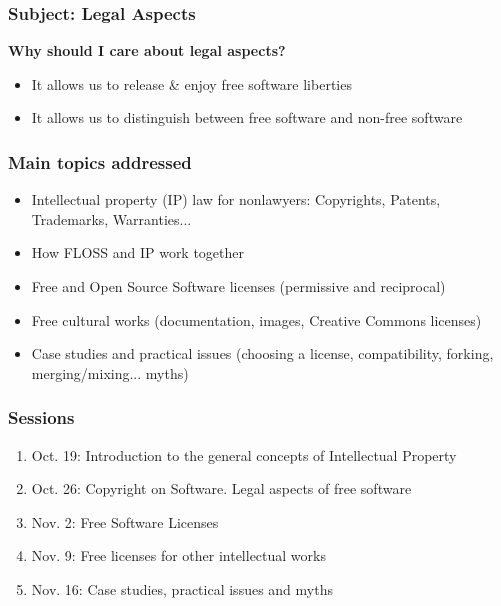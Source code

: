 \documentclass{beamer}
\begin{document}

\begin{frame}
\frametitle{Subject: Legal Aspects}


\center \Large \textbf{Why should I care about legal aspects?}
 
\pause

\bigskip
\normalsize
\begin{itemize}
\item \alert{It allows us to release \& enjoy free software liberties}
\pause
\item \alert{It allows us to distinguish between free software and non-free software}
\end{itemize}

\end{frame}


\begin{frame}
\frametitle{Main topics addressed}

\begin{itemize}
   \item Intellectual property (IP) law \alert{for nonlawyers}: Copyrights,
Patents, Trademarks, Warranties...
   \item How FLOSS and IP work together
   \item Free and Open Source Software licenses (permissive and reciprocal)
   \item Free cultural works (documentation, images, Creative Commons
licenses)
   \item Case studies and practical issues (choosing a license, compatibility,
forking, merging/mixing... myths)
\end{itemize}

\end{frame}


\begin{frame}
\frametitle{Sessions}

\begin{enumerate}
\item \alert{Oct. 19:} Introduction to the general concepts of Intellectual Property
\item \alert{Oct. 26:} Copyright on Software. Legal aspects of free software
\item \alert{Nov. 2:} Free Software Licenses
\item \alert{Nov. 9:} Free licenses for other intellectual works
\item \alert{Nov. 16:} Case studies, practical issues and myths
\end{enumerate}

\end{frame}
\end{document}

